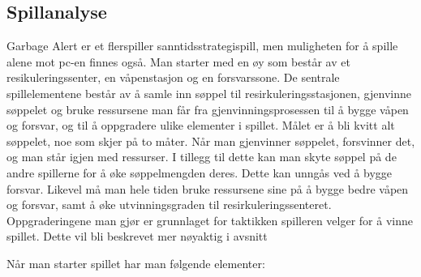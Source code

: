 

\subsection{Spillanalyse}

Garbage Alert er et flerspiller sanntidsstrategispill, men muligheten for å spille alene mot pc-en finnes også. 
Man starter med en øy som består av et resikuleringssenter, en våpenstasjon og en forsvarssone. De sentrale spillelementene består av å samle inn søppel til resirkuleringsstasjonen, gjenvinne søppelet og bruke ressursene man får fra gjenvinningsprosessen til å bygge våpen og forsvar, og til å oppgradere ulike elementer i spillet. Målet er å bli kvitt alt søppelet, noe som skjer på to måter. Når man gjenvinner søppelet, forsvinner det, og man står igjen med ressurser. I tillegg til dette kan man skyte søppel på de andre spillerne for å øke søppelmengden deres. Dette kan unngås ved å bygge forsvar.
Likevel må man hele tiden bruke ressursene sine på å bygge bedre våpen og forsvar, samt å øke utvinningsgraden til resirkuleringssenteret. Oppgraderingene man gjør er grunnlaget for taktikken spilleren velger for å vinne spillet. Dette vil bli beskrevet mer nøyaktig i avsnitt %


Når man starter spillet har man følgende elementer:

